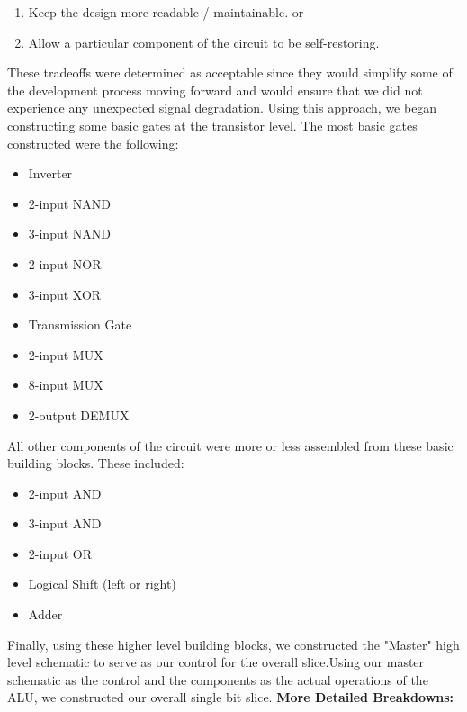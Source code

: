 \documentclass[12pt]{article}
\begin{document}
	\begin{enumerate}[label=(\alph*)]
		\item Keep the design more readable / maintainable. 
		\newline \newline
		or
		\item Allow a particular component of the circuit to be self-restoring. 
	\end{enumerate}
	These tradeoffs were determined as acceptable since they would simplify some of the
	development process moving forward and would ensure that we did not experience any
	unexpected signal degradation. 
	\newline \newline
	Using this approach, we began constructing some basic gates at the transistor level. The most
	basic gates constructed were the following:
	\begin{itemize}
		\item Inverter
		\item 2-input NAND
		\item 3-input NAND
		\item 2-input NOR
		\item 3-input XOR
		\item Transmission Gate
		\item 2-input MUX
		\item 8-input MUX
		\item 2-output DEMUX
	\end{itemize}
	All other components of the circuit were more or less assembled from these basic building
	blocks. These included:
	\begin{itemize}
		\item 2-input AND
		\item 3-input AND
		\item 2-input OR
		\item Logical Shift (left or right)
		\item Adder
	\end{itemize}
	Finally, using these higher level building blocks, we constructed the "Master" high level
	schematic to serve as our control for the overall slice.Using our master schematic as 
	the control and the components as the actual operations of the ALU, we constructed 
	our overall single bit slice. 
	\newline \newline
	\textbf{More Detailed Breakdowns:}
	\newline \newline
\end{document}
